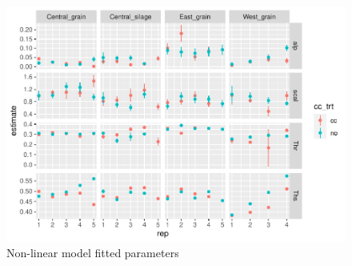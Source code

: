 \documentclass[
]{article}
\begin{document}
\begin{figure}
\centering
\includegraphics{rmd-supp-mat_files/figure-latex/paramsalp-1.pdf}
\caption{Non-linear model fitted parameters}
\end{figure}
\end{document}
